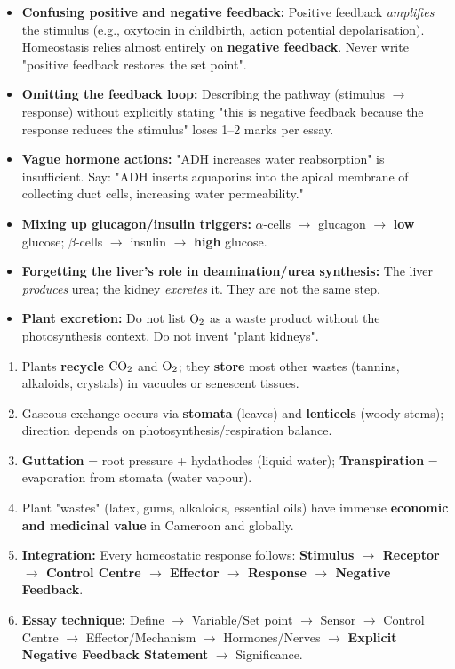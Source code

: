 \documentclass[11pt]{article}
\begin{document}
\begin{attention}
\begin{itemize}
\item \textbf{Confusing positive and negative feedback:} Positive feedback \emph{amplifies} the stimulus (e.g., oxytocin in childbirth, action potential depolarisation). Homeostasis relies almost entirely on \textbf{negative feedback}. Never write "positive feedback restores the set point".
\item \textbf{Omitting the feedback loop:} Describing the pathway (stimulus $\to$ response) without explicitly stating "this is negative feedback because the response reduces the stimulus" loses 1–2 marks per essay.
\item \textbf{Vague hormone actions:} "ADH increases water reabsorption" is insufficient. Say: "ADH inserts aquaporins into the apical membrane of collecting duct cells, increasing water permeability."
\item \textbf{Mixing up glucagon/insulin triggers:} $\alpha$-cells $\to$ glucagon $\to$ \textbf{low} glucose; $\beta$-cells $\to$ insulin $\to$ \textbf{high} glucose.
\item \textbf{Forgetting the liver's role in deamination/urea synthesis:} The liver \emph{produces} urea; the kidney \emph{excretes} it. They are not the same step.
\item \textbf{Plant excretion:} Do not list $\ce{O2}$ as a waste product without the photosynthesis context. Do not invent "plant kidneys".
\end{itemize}
\end{attention}

\begin{aretenir}
\begin{enumerate}
\item Plants \textbf{recycle} $\ce{CO2}$ and $\ce{O2}$; they \textbf{store} most other wastes (tannins, alkaloids, crystals) in vacuoles or senescent tissues.
\item Gaseous exchange occurs via \textbf{stomata} (leaves) and \textbf{lenticels} (woody stems); direction depends on photosynthesis/respiration balance.
\item \textbf{Guttation} = root pressure + hydathodes (liquid water); \textbf{Transpiration} = evaporation from stomata (water vapour).
\item Plant "wastes" (latex, gums, alkaloids, essential oils) have immense \textbf{economic and medicinal value} in Cameroon and globally.
\item \textbf{Integration:} Every homeostatic response follows: \textbf{Stimulus $\to$ Receptor $\to$ Control Centre $\to$ Effector $\to$ Response $\to$ Negative Feedback}.
\item \textbf{Essay technique:} Define $\to$ Variable/Set point $\to$ Sensor $\to$ Control Centre $\to$ Effector/Mechanism $\to$ Hormones/Nerves $\to$ \textbf{Explicit Negative Feedback Statement} $\to$ Significance.
\end{enumerate}
\end{aretenir}
\end{document}
